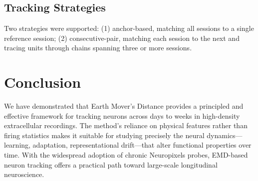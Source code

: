 \documentclass[11pt]{article}
\begin{document}
\subsection{Tracking Strategies}

Two strategies were supported: (1) anchor-based, matching all sessions to a single reference session; (2) consecutive-pair, matching each session to the next and tracing units through chains spanning three or more sessions.

\section{Conclusion}

We have demonstrated that Earth Mover's Distance provides a principled and effective framework for tracking neurons across days to weeks in high-density extracellular recordings. The method's reliance on physical features rather than firing statistics makes it suitable for studying precisely the neural dynamics---learning, adaptation, representational drift---that alter functional properties over time. With the widespread adoption of chronic Neuropixels probes, EMD-based neuron tracking offers a practical path toward large-scale longitudinal neuroscience.



\end{document}
